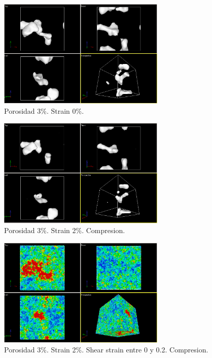 \documentclass[10pt, oneside]{article} %
\begin{document}
\begin{figure}[H]
\centering
\includegraphics[width=8cm]{Figures/Porosidad/porosidad_3_muestra_0strain.png}
\caption{Porosidad 3\%. Strain 0\%.}
\end{figure}

\begin{figure}[H]
\centering
\includegraphics[width=8cm]{Figures/Porosidad/porosidad_3_muestra_2strain.png}
\caption{Porosidad 3\%. Strain 2\%. Compresion.}
\end{figure}

\begin{figure}[H]
\centering
\includegraphics[width=8cm]{Figures/Porosidad/porosidad_3_muestra_2strain_color_0_02.png}
\caption{Porosidad 3\%. Strain 2\%. Shear strain entre 0 y 0.2. Compresion.}
\end{figure}
\end{document}

